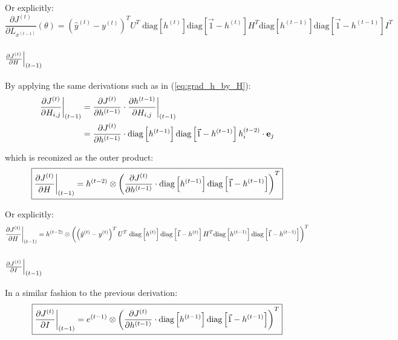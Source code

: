 Or explicitly:
\begin{equation}
  \frac{\partial J^{(t)}}{\partial L_{x^{(t-1)}}}(\theta) = \left(\hat{y}^{(t)} - y^{(t)}\right)^T U^T \; \text{diag}\left[ h^{(t)} \right]  \text{diag}\left[ \vec{1} - h^{(t)} \right] H^T \text{diag}\left[ h^{(t-1)} \right]  \text{diag}\left[ \vec{1} - h^{(t-1)} \right] I^T 
\end{equation}


\subsubsection[short]{$\restr{\frac{\partial J^{(t)}}{\partial H}}{(t-1)}$}

By applying the same derivations such as in (\ref{eq:grad_h_by_H}):
\begin{equation}
  \begin{aligned}
    \restr{\frac{\partial J^{(t)}}{\partial H_{i,j}}}{(t-1)} &= \frac{\partial J^{(t)}}{\partial h^{(t-1)}} \cdot \restr{\frac{\partial h^{(t-1)}}{\partial H_{i,j}}}{(t-1)} \\
    &= \frac{\partial J^{(t)}}{\partial h^{(t-1)}} \cdot \text{diag}\left[ h^{(t-1)} \right]  \text{diag}\left[ \vec{1} - h^{(t-1)} \right] h^{(t-2)}_i \cdot \textbf{\text{e}}_j
  \end{aligned}
\end{equation}

which is reconized as the outer product:
\begin{equation}
  \boxed {\restr{\frac{\partial J^{(t)}}{\partial H}}{(t-1)} = h^{(t-2)} \otimes \left( \frac{\partial J^{(t)}}{\partial h^{(t-1)}} \cdot \text{diag}\left[ h^{(t-1)} \right]  \text{diag}\left[ \vec{1} - h^{(t-1)} \right] \right)^T }
\end{equation}

Or explicitly:
\begin{equation}
  \restr{\frac{\partial J^{(t)}}{\partial H}}{(t-1)} = h^{(t-2)} \otimes \left( \left(\hat{y}^{(t)} - y^{(t)}\right)^T U^T \; \text{diag}\left[ h^{(t)} \right]  \text{diag}\left[ \vec{1} - h^{(t)} \right] H^T \text{diag}\left[ h^{(t-1)} \right]  \text{diag}\left[ \vec{1} - h^{(t-1)} \right] \right)^T
\end{equation}


\subsubsection[short]{$\restr{\frac{\partial J^{(t)}}{\partial I}}{(t-1)}$}
In a similar fashion to the previous derivation:
\begin{equation}
  \boxed {\restr{\frac{\partial J^{(t)}}{\partial I}}{(t-1)} = e^{(t-1)} \otimes \left( \frac{\partial J^{(t)}}{\partial h^{(t-1)}} \cdot \text{diag}\left[ h^{(t-1)} \right]  \text{diag}\left[ \vec{1} - h^{(t-1)} \right] \right)^T }
\end{equation}


